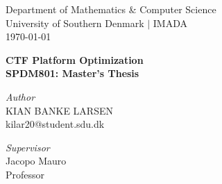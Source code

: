 

\usepackage[block=ragged, sorting=nyt, style=authoryear-ibid, backend=biber]{biblatex}
\setlength{}



\begin{titlepage}
    \begin{centering}
    \vspace*{-20px}\large Department of Mathematics \& Computer Science\\
    University of Southern Denmark $|$ IMADA \\
    \today \\
    
    \vspace{\fill}
    
    \huge{\bf  CTF Platform Optimization} \\
    \Large{\bf SPDM801: Master's Thesis}
    
    \vspace{\fill}
    
    \begin{minipage}{0.45\textwidth} 
    \begin{flushleft}
        \Large
        \textit{Author}\\
        KIAN BANKE LARSEN\\
        kilar20@student.sdu.dk
    \end{flushleft}
    \end{minipage}
    
    \vspace{\fill}
    
    \begin{minipage}{0.45\textwidth}
    \begin{flushleft}
        \Large
        \textit{Supervisor}\\
        Jacopo Mauro\\
        Professor
    \end{flushleft}
    \end{minipage}
    
    \vspace{\fill}
    
    
    
    \vspace*{0.1cm}
    
    \end{centering}
    
    \thispagestyle{empty}
\end{titlepage}

